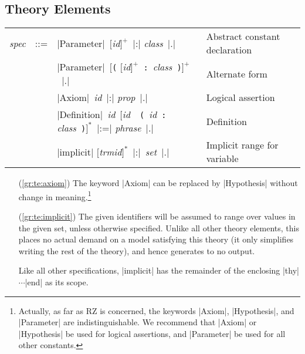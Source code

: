 \documentclass[11pt]{article}
\newcommand{\metav}[1]{\mbox{\textit{#1}}}
\newcommand{\MId}{\metav{mdlid}}
\newcommand{\EId}{\metav{trmid}}
\newcommand{\Id}{\metav{id}}
\newcommand{\Phrase}{\metav{phrase}}
\newcommand{\Class}{\metav{class}}
\newcommand{\Setexp}{\metav{set}}
\newcommand{\Specification}{\metav{spec}}
\newcommand{\Propexp}{\metav{prop}}
\newcommand{\Theoryexp}{\metav{theory}}
\newcommand{\Repeat}[1]{$[${}#1{}$]^*$}
\newcommand{\RRepeat}[1]{$[${}#1{}$]^+$}
\begin{document}
\iffalse
\noindent Theories can be defined as follows:
\begin{itemize}
\item $\THEORY\ \Theoryname\ [\MParam]^*\ \EQUALS\ \Theoryexp$

   A named theory with the given definitions.  It may be parameterized
   by one or more models; each model parameter, if present, must be written
   with the syntax $\LPAREN \MId \COLON \Theoryexp \RPAREN$.
\end{itemize}
\fi


\subsection{Theory Elements}
\begin{center}
	\begin{tabular}{rRlE}
		\Specification &::=& |Parameter|\ \RRepeat{\Id}\ |:| \Class\ |.|&Abstract constant declaration\label{gr:te:parameter}\\
	 	& \mid & |Parameter|\ \RRepeat{\Verb+(+ \RRepeat{\Id}\ \Verb+:+\ \Class\ \Verb+)+}\ |.|&Alternate form\label{gr:te:parameter2}\\
	    & \mid & |Axiom|\ \Id\ |:| \Propexp\ |.|&Logical assertion\label{gr:te:axiom}\\
		& \mid & |Definition|\ \Id\ \Repeat{\Id\ \textbar\ \Verb+(+\ \Id\ \Verb+:+ \Class\ \Verb+)+}\ |:=| \Phrase\ |.|&Definition\label{gr:te:definition}\\
		& \mid & |implicit| \Repeat{\EId}\ |:|\ \Setexp\ |.|&Implicit range for variable\label{gr:te:implicit}\\
	\end{tabular}
\end{center}
\begin{itemize}
\item[(\ref{gr:te:axiom})] The keyword |Axiom| can be replaced by |Hypothesis| without change in meaning.\footnote{Actually, as far as RZ is concerned, the keywords |Axiom|, |Hypothesis|, and |Parameter| are indistinguishable.  We recommend that |Axiom| or |Hypothesis| be used for logical assertions, and |Parameter| be used for all other constants.}

\item[(\ref{gr:te:implicit})] 
  The given identifiers will be assumed to range over values in the
  given set, unless otherwise specified.  Unlike all other theory elements, this places no actual demand
  on a model satisfying this theory (it only simplifies writing
  the rest of the theory), and hence generates to
  no output.  
  
  Like all other specifications, |implicit| has the remainder of the
  enclosing |thy|$\cdots$|end| as its scope.
\end{itemize}
\end{document}
